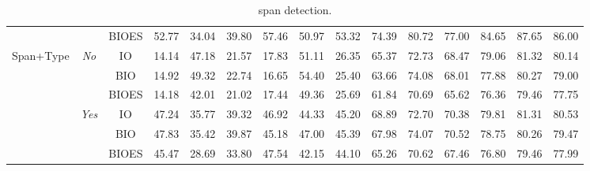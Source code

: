 \documentclass[11pt]{article}
\begin{document}
\begin{table*}[htb]
{\begin{tabular}{ccccccccccccccc}
                                        &                                                & BIOES                            & 52.77   & 34.04 & 39.80 & 57.46   & 50.97 & 53.32 & 74.39   & 80.72 & 77.00 & 84.65   & 87.65 & 86.00 \\
        \cmidrule(lr){1-3} \cmidrule(lr){4-9} \cmidrule(lr){10-15} 
        \multirow{6}{*}{Span+Type}      & \multirow{3}{*}{\textit{No}}  & IO                                                & 14.14   & 47.18 & 21.57 & 17.83   & 51.11 & 26.35 & 65.37   & 72.73 & 68.47 & 79.06   & 81.32 & 80.14 \\
                                        &                                                & BIO                              & 14.92   & 49.32 & 22.74 & 16.65   & 54.40 & 25.40 & 63.66   & 74.08 & 68.01 & 77.88   & 80.27 & 79.00 \\
                                        &                                                & BIOES                            & 14.18   & 42.01 & 21.02 & 17.44   & 49.36 & 25.69 & 61.84   & 70.69 & 65.62 & 76.36   & 79.46 & 77.75 \\
        \cmidrule(lr){2-2} \cmidrule(lr){3-3} \cmidrule(lr){4-9} \cmidrule(lr){10-15}
                                        & \multirow{3}{*}{\textit{Yes}} & IO                                                & 47.24   & 35.77 & 39.32 & 46.92   & 44.33 & 45.20 & 68.89   & 72.70 & 70.38 & 79.81   & 81.31 & 80.53 \\
                                        &                                                & BIO                              & 47.83   & 35.42 & 39.87 & 45.18   & 47.00 & 45.39 & 67.98   & 74.07 & 70.52 & 78.75   & 80.26 & 79.47 \\
                                        &                                                & BIOES                            & 45.47   & 28.69 & 33.80 & 47.54   & 42.15 & 44.10 & 65.26   & 70.62 & 67.46 & 76.80   & 79.46 & 77.99 \\
        \bottomrule
        \end{tabular}
    }
    \caption{span detection.}
    \label{tab:app_span_detection_1}
\end{table*}
\end{document}
